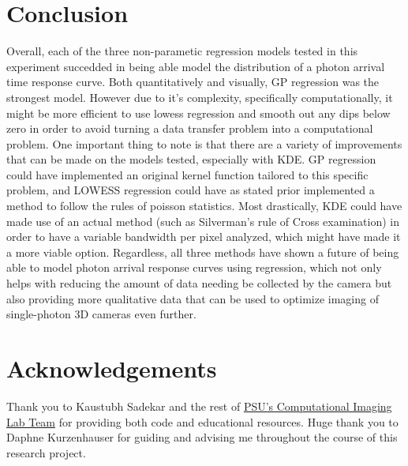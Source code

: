 \documentclass[letterpaper,12pt]{article}
\begin{document}
\section{Conclusion}
Overall, each of the three non-parametic regression models tested in this experiment succedded 
in being able model the distribution of a photon arrival time response curve. Both quantitatively
and visually, GP regression was the strongest model. However due to it's complexity, specifically 
computationally, it might be more efficient to use lowess regression and smooth out any dips 
below zero in order to avoid turning a data transfer problem into a computational problem. One
important thing to note is that there are a variety of improvements that can be made on the models
tested, especially with KDE. GP regression could have implemented an original kernel function
tailored to this specific problem, and LOWESS regression could have as stated prior implemented
a method to follow the rules of poisson statistics. Most drastically, KDE could have made use
of an actual method (such as Silverman's rule of Cross examination) in order to have a variable
bandwidth per pixel analyzed, which might have made it a more viable option. Regardless, all
three methods have shown a future of being able to model photon arrival response curves using
regression, which not only helps with reducing the amount of data needing be collected by the
camera but also providing more qualitative data that can be used to optimize imaging of
single-photon 3D cameras even further.

\section{Acknowledgements}
Thank you to Kaustubh Sadekar and the rest of 
\href{https://www.computational.camera/team}{PSU's Computational Imaging Lab Team} for providing
both code and educational resources. Huge thank you to Daphne Kurzenhauser for guiding and
advising me throughout the course of this research project.

\printbibliography
\end{document}
